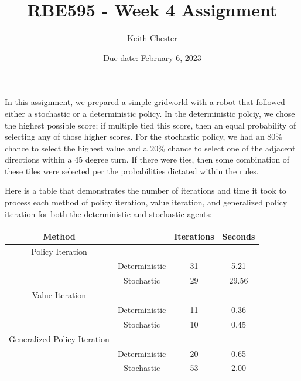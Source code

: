 \documentclass{article}
\title{RBE595 - Week 4 Assignment}
\author{Keith Chester}
\date{Due date: February 6, 2023}
\begin{document}
\maketitle

In this assignment, we prepared a simple gridworld with a robot that followed either a stochastic or a deterministic policy. In the deterministic polciy, we chose the highest possible score; if multiple tied this score, then an equal probability of selecting any of those higher scores. For the stochastic policy, we had an $80\%$ chance to select the highest value and a $20\%$ chance to select one of the adjacent directions within a 45 degree turn. If there were ties, then some combination of these tiles were selected per the probabilities dictated within the rules.

Here is a table that demonstrates the number of iterations and time it took to process each method of policy iteration, value iteration, and generalized policy iteration for both the deterministic and stochastic agents:

\begin{center}
    \begin{tabular}{ |cc|c|c| }
        \hline
        Method                       &               & Iterations & Seconds \\
        \hline
        Policy Iteration             &               &            &         \\
                                     & Deterministic & 31         & 5.21    \\
                                     & Stochastic    & 29         & 29.56   \\
        \hline
        Value Iteration              &               &            &         \\
                                     & Deterministic & 11         & 0.36    \\
                                     & Stochastic    & 10         & 0.45    \\
        \hline
        Generalized Policy Iteration &               &            &         \\
                                     & Deterministic & 20         & 0.65    \\
                                     & Stochastic    & 53         & 2.00    \\
        \hline
    \end{tabular}
\end{center}
\end{document}
